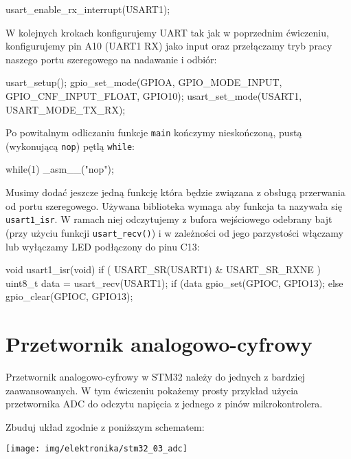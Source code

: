 \documentclass{pdfBooklets}
\begin{document}
\begin{CodeFrame*}[c]{}
  usart_enable_rx_interrupt(USART1);
\end{CodeFrame*}

W kolejnych krokach konfigurujemy UART tak jak w poprzednim ćwiczeniu, konfigurujemy pin A10 (UART1 RX) jako input oraz przełączamy tryb pracy naszego portu szeregowego na nadawanie i odbiór:

\begin{CodeFrame*}[c]{}
  usart_setup();
  gpio_set_mode(GPIOA, GPIO_MODE_INPUT, GPIO_CNF_INPUT_FLOAT, GPIO10);
  usart_set_mode(USART1, USART_MODE_TX_RX);
\end{CodeFrame*}

Po powitalnym odliczaniu funkcje \Verb$main$ kończymy nieskończoną, pustą (wykonującą \Verb$nop$) pętlą \Verb$while$:

\begin{CodeFrame*}[c]{}
  while(1)
      _asm__("nop");
\end{CodeFrame*}

Musimy dodać jeszcze jedną funkcję która będzie związana z obsługą przerwania od portu szeregowego.
Używana biblioteka wymaga aby funkcja ta nazywała się \Verb#usart1_isr#.
W ramach niej odczytujemy z bufora wejściowego odebrany bajt (przy użyciu funkcji \Verb$usart_recv()$) i w zależności od jego parzystości włączamy lub wyłączamy LED podłączony do pinu C13:

\begin{CodeFrame*}[c]{}
  void usart1_isr(void) {
    if ( USART_SR(USART1) & USART_SR_RXNE ) {
      uint8_t data = usart_recv(USART1);
      if (data%
        gpio_set(GPIOC, GPIO13);
      else
        gpio_clear(GPIOC, GPIO13);
    }
  }
\end{CodeFrame*}



\section{Przetwornik analogowo-cyfrowy}
Przetwornik analogowo-cyfrowy w STM32 należy do jednych z bardziej zaawansowanych. W tym ćwiczeniu pokażemy prosty przykład
użycia przetwornika ADC do odczytu napięcia z jednego z pinów mikrokontrolera.

Zbuduj układ zgodnie z poniższym schematem:

\begin{center}\texttt{[image: img/elektronika/stm32\_03\_adc]}\end{center}
\end{document}
